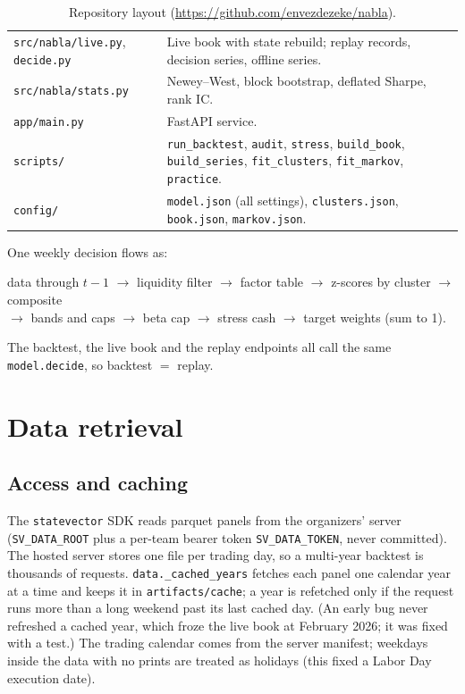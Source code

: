 \documentclass[11pt]{article}
\newcommand{\code}[1]{\texttt{#1}}
\begin{document}
\begin{table}[H]
\begin{tabularx}{\textwidth}{lL}
\code{src/nabla/live.py}, \code{decide.py} & Live book with state rebuild; replay records, decision series, offline series. \\
\code{src/nabla/stats.py} & Newey--West, block bootstrap, deflated Sharpe, rank IC. \\
\code{app/main.py} & FastAPI service. \\
\code{scripts/} & \code{run\_backtest}, \code{audit}, \code{stress}, \code{build\_book}, \code{build\_series}, \code{fit\_clusters}, \code{fit\_markov}, \code{practice}. \\
\code{config/} & \code{model.json} (all settings), \code{clusters.json}, \code{book.json}, \code{markov.json}. \\
\bottomrule
\end{tabularx}
\caption{Repository layout (\url{https://github.com/envezdezeke/nabla}).}
\end{table}

\noindent One weekly decision flows as:
\begin{center}
data through $t-1$ $\to$ liquidity filter $\to$ factor table $\to$ z-scores by cluster $\to$ composite\\
$\to$ bands and caps $\to$ beta cap $\to$ stress cash $\to$ target weights (sum to 1).
\end{center}
The backtest, the live book and the replay endpoints all call the same \code{model.decide}, so backtest $=$ replay.

\section{Data retrieval}

\subsection{Access and caching}
The \code{statevector} SDK reads parquet panels from the organizers' server (\code{SV\_DATA\_ROOT} plus a per-team
bearer token \code{SV\_DATA\_TOKEN}, never committed). The hosted server stores one file per trading day, so a
multi-year backtest is thousands of requests. \code{data.\_cached\_years} fetches each panel one calendar year at a
time and keeps it in \code{artifacts/cache}; a year is refetched only if the request runs more than a long weekend past
its last cached day. (An early bug never refreshed a cached year, which froze the live book at February 2026; it was
fixed with a test.) The trading calendar comes from the server manifest; weekdays inside the data with no prints are
treated as holidays (this fixed a Labor Day execution date).
\end{document}
